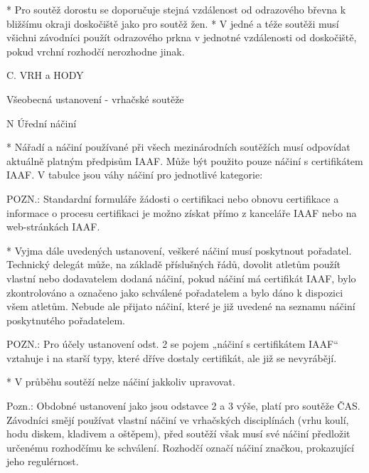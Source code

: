 * Pro soutěž dorostu se doporučuje stejná vzdálenost od odrazového břevna k bližšímu okraji doskočiště jako pro soutěž žen.
* V jedné a téže soutěži musí všichni závodníci použít odrazového prkna v jednotné vzdálenosti od doskočiště, pokud vrchní rozhodčí nerozhodne jinak.
\enditems


C. VRH a HODY

\secc Všeobecná ustanovení - vrhačské soutěže

\begitems \style N
Úřední náčiní

* Nářadí a náčiní používané při všech mezinárodních soutěžích musí odpovídat aktuálně platným předpisům IAAF. Může být použito pouze náčiní s certifikátem IAAF. V tabulce jsou váhy náčiní pro jednotlivé kategorie:


POZN.: Standardní  formuláře žádosti o certifikaci nebo obnovu certifikace a informace o procesu certifikaci  je možno získat přímo z kanceláře  IAAF nebo na web-stránkách IAAF.

* Vyjma dále uvedených ustanovení, veškeré náčiní musí poskytnout pořadatel. Technický delegát může, na základě příslušných řádů, dovolit atletům použít vlastní nebo dodavatelem dodaná náčiní, pokud náčiní má certifikát IAAF, bylo zkontrolováno a označeno jako schválené pořadatelem a bylo dáno k dispozici všem atletům. Nebude ale přijato náčiní, které je již uvedené na seznamu náčiní poskytnutého pořadatelem.

POZN.: Pro účely ustanovení odst. 2 se pojem „náčiní s certifikátem IAAF“ vztahuje i na starší typy, které dříve dostaly certifikát, ale již se nevyrábějí.

* V průběhu soutěží nelze náčiní jakkoliv upravovat.

Pozn.:  Obdobné ustanovení jako jsou odstavce 2 a 3 výše, platí pro soutěže ČAS. Závodníci smějí používat vlastní náčiní ve vrhačských disciplínách (vrhu koulí, hodu diskem, kladivem a oštěpem), před soutěží však musí své náčiní předložit určenému rozhodčímu ke schválení. Rozhodčí označí náčiní značkou, prokazující jeho regulérnost.

